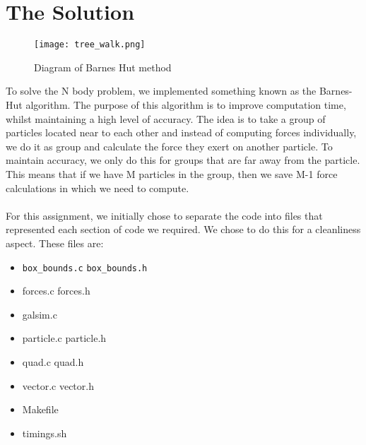 \documentclass{article}
\begin{document}
\section{The Solution}
\begin{figure}[htb]
\begin{center}
\texttt{[image: tree\_walk.png]}
\caption{Diagram of Barnes Hut method}
\end{center}
\end{figure}
To solve the N body problem, we implemented something known as the Barnes-Hut algorithm. The purpose of this algorithm is to improve computation time, whilst maintaining a high level of accuracy. The idea is to take a group of particles located near to each other and instead of computing forces individually, we do it as group and calculate the force they exert on another particle. To maintain accuracy, we only do this for groups that are far away from the particle. This means that if we have M particles in the group, then we save M-1 force calculations in which we need to compute. 
\\\\
For this assignment, we initially  chose to separate the code into files that represented each section of code we required. We chose to do this for a cleanliness aspect. These files are: 
\begin{itemize}
    \item \verb|box_bounds.c| \verb|box_bounds.h|
    \item forces.c forces.h
    \item galsim.c
    \item particle.c particle.h
    \item quad.c quad.h
    \item vector.c vector.h
    \item Makefile
    \item timings.sh
\end{itemize}
\end{document}
